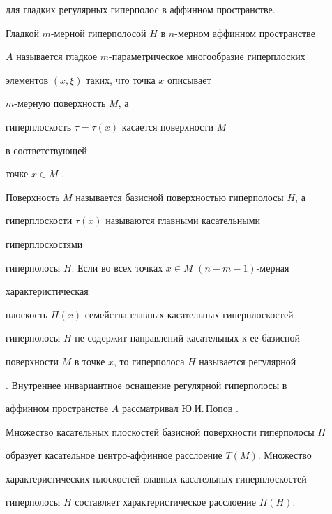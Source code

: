 для гладких регулярных гиперполос в аффинном пространстве. 


 


\begin{defn} 


Гладкой $m$-мерной гиперполосой $H$ в $n$-мерном аффинном пространстве 


$A$ называется гладкое $m$-параметрическое многообразие гиперплоских 


элементов $(x,\xi)$ таких, что точка $x$ описывает 


$m$-мерную поверхность $M$, а 


гиперплоскость $\tau=\tau(x)$ касается поверхности $M$ 


в соответствующей 


точке $x\in M$ \cite{7}. 


\end{defn} 


 


Поверхность $M$ называется базисной поверхностью гиперполосы $H$, а 


гиперплоскости $\tau(x)$ называются главными касательными 


гиперплоскостями 


гиперполосы $H$. Если во всех точках $x\in M$\; $(n-m-1)$-мерная 


характеристическая 


плоскость $\Pi(x)$ семейства главных касательных гиперплоскостей 


гиперполосы $H$ не содержит направлений касательных к ее базисной 


поверхности $M$ в точке $x$, то гиперполоса $H$ называется регулярной 


\cite{7}. Внутреннее инвариантное оснащение регулярной гиперполосы в 


аффинном пространстве $A$ рассматривал Ю.И.\,Попов \cite{8}. 


 


Множество касательных плоскостей базисной поверхности гиперполосы $H$ 


образует касательное центро-аффинное расслоение $T(M)$. Множество 


характеристических плоскостей главных касательных гиперплоскостей 


гиперполосы $H$ составляет характеристическое расслоение $\Pi(H)$. 



